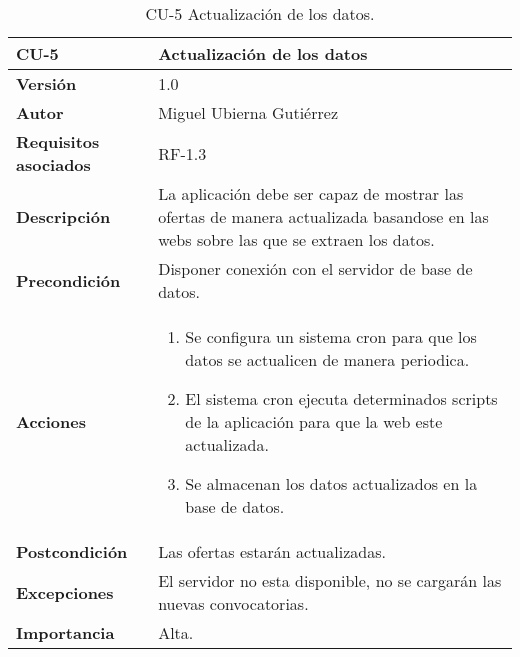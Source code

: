 \begin{table}[p]
	\centering
	\begin{tabularx}{\linewidth}{ p{} p{} }
		\toprule
		\textbf{CU-5}    & \textbf{Actualización de los datos}\\
		\toprule
		\textbf{Versión}              & 1.0    \\
		\textbf{Autor}                & Miguel Ubierna Gutiérrez \\
		\textbf{Requisitos asociados} & RF-1.3 \\
		\textbf{Descripción}          & La aplicación debe ser capaz de mostrar las ofertas de manera actualizada basandose en las webs sobre las que se extraen los datos. \\
		\textbf{Precondición}         & Disponer conexión con el servidor de base de datos.\\
		\textbf{Acciones}             &
		\begin{enumerate}
			\def\labelenumi{\arabic{enumi}.}
			\tightlist
			\item Se configura un sistema cron para que los datos se actualicen de manera periodica.
			\item El sistema cron ejecuta determinados scripts de la aplicación para que la web este actualizada.
                \item Se almacenan los datos actualizados en la base de datos.
		\end{enumerate}\\
		\textbf{Postcondición}        & Las ofertas estarán actualizadas. \\
		\textbf{Excepciones}          & El servidor no esta disponible, no se cargarán las nuevas convocatorias.  \\
		\textbf{Importancia}          & Alta.  \\
		\bottomrule
	\end{tabularx}
	\caption{CU-5 Actualización de los datos.}
\end{table}


